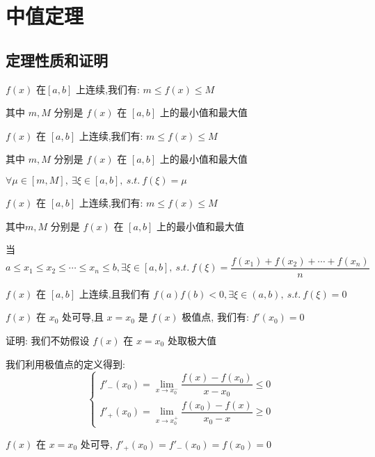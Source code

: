 \chapter{中值定理}
\section{定理性质和证明}
\begin{theorem}[有界和最值定理]

	$f(x)$ 在$[a,b]$ 上连续,我们有: $m\leq f(x)\leq M$

	其中 $m,M$ 分别是 $f(x)$ 在 $[a,b]$ 上的最小值和最大值
\end{theorem}
\begin{theorem}[介值定理]

	$f(x)$ 在 $[a,b]$ 上连续,我们有: $m\leq f(x)\leq M$

	其中 $m,M$ 分别是 $f(x)$ 在 $[a,b]$ 上的最小值和最大值

	$\forall \mu\in [m,M],\ \exists \xi\in[a,b],\ s.t.\ f(\xi)=\mu$
\end{theorem}
\begin{theorem}[平均值定理]

	$f(x)$ 在 $[a,b]$ 上连续,我们有: $m\leq f(x)\leq M$

	其中$m,M$ 分别是 $f(x)$ 在 $[a,b]$ 上的最小值和最大值

	当 $a\leq x_{1}\leq x_{2}\leq\cdots\leq x_{n}\leq b,\exists \xi\in[a,b],\ s.t.\ f(\xi)=\dfrac{f(x_{1})+f(x_{2})+\cdots+f(x_{n})}{n}$
\end{theorem}
\begin{theorem}[零点定理]

	$f(x)$ 在 $[a,b]$ 上连续,且我们有 $f(a)f(b)<0,\exists \xi\in(a,b),\ s.t.\ f(\xi)=0$
\end{theorem}
\begin{theorem}[费马定理]

	$f(x)$ 在 $x_{0}$ 处可导,且 $x=x_{0}$ 是 $f(x)$ 极值点, 我们有: $f'(x_{0})=0$

	证明: 我们不妨假设 $f(x)$ 在 $x=x_{0}$ 处取极大值

	我们利用极值点的定义得到:
	$$ \left\lbrace
		\begin{array}{l}
			f'_{-}(x_{0})=\lim\limits_{x\rightarrow x_{0}^{-}}\dfrac{f(x)-f(x_{0})}{x-x_{0}}\leq 0 \\
			f'_{+}(x_{0})=\lim\limits_{x\rightarrow x_{0}^{+}}\dfrac{f(x_{0})-f(x)}{x_{0}-x}\geq 0
		\end{array}
		\right. $$

	$f(x)$ 在 $x=x_{0}$ 处可导, $f'_{+}(x_{0})=f'_{-}(x_{0})=f(x_{0})=0$
\end{theorem}
